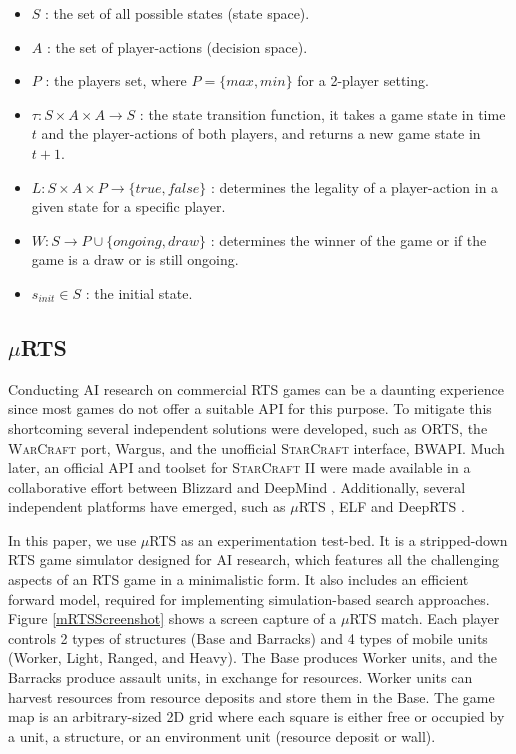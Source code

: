 \documentclass[conference]{IEEEtran}
\newcommand{\mRTS}{$\mu$RTS}
\begin{document}
\begin{itemize}
\item $S$ : the set of all possible states (state space).
\item $A$ : the set of player-actions (decision space).
\item $P$ : the players set, where $P=\{max,min\}$ for a 2-player setting.
\item $\tau : S \times A \times A \rightarrow S$ : the state transition function, it takes a game state in time $t$ and the player-actions of both players, and returns a new game state in $t+1$.
\item $L: S \times A \times P \rightarrow \{true,false\}$ : determines the legality of a player-action in a given state for a specific player.
\item $W: S \rightarrow P \cup \{ongoing,draw\}$ : determines the winner of the game or if the game is a draw or is still ongoing.
\item $s_{init} \in S$ : the initial state.
\end{itemize}


\subsection{\mRTS{}}

Conducting AI research on commercial RTS games can be a daunting experience since most games do not offer a suitable API for this purpose. To mitigate this shortcoming several independent solutions were developed, such as ORTS, the \textsc{WarCraft} port, Wargus, and the unofficial \textsc{StarCraft} interface, BWAPI. Much later, an official API and toolset for \textsc{StarCraft II} were made available in a collaborative effort between Blizzard and DeepMind \cite{vinyals_starcraft_2017-1}. Additionally, several independent platforms have emerged, such as \mRTS{} \cite{ontanon_combinatorial_2013}, ELF \cite{tian_elf_2017} and DeepRTS \cite{andersen_deep_2018}.

In this paper, we use \mRTS{} as an experimentation test-bed. It is a stripped-down RTS game simulator designed for AI research, which features all the challenging aspects of an RTS game in a minimalistic form. It also includes an efficient forward model, required for implementing simulation-based search approaches. Figure \ref{mRTSScreenshot} shows a screen capture of a \mRTS{} match. Each player controls 2 types of structures (Base and Barracks) and 4 types of mobile units (Worker, Light, Ranged, and Heavy). The Base produces Worker units, and the Barracks produce assault units, in exchange for resources. Worker units can harvest resources from resource deposits and store them in the Base. The game map is an arbitrary-sized 2D grid where each square is either free or occupied by a unit, a structure, or an environment unit (resource deposit or wall).
\end{document}
